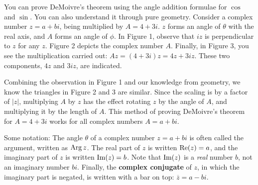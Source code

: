 \documentclass[../textbook.tex]{subfiles}
\begin{document}
You can prove DeMoivre’s theorem using the angle addition formulae for $\cos$ and $\sin$. You can also understand it through pure geometry. Consider a complex number $z = a + bi$, being multiplied by $A = 4 + 3i$. $z$ forms an angle of $\theta$ with the real axis, and $A$ forms an angle of $\phi$. In Figure 1, observe that $iz$ is perpendicular to $z$ for any $z$. Figure 2 depicts the complex number $A$. Finally, in Figure 3, you see the multiplication carried out: $Az = (4+3i)z = 4z + 3iz$. These two components, $4z$ and $3iz$, are indicated.

Combining the observation in Figure 1 and our knowledge from geometry, we know the triangles in Figure 2 and 3 are similar. Since the scaling is by a factor of $|z|$, multiplying $A$ by $z$ has the effect rotating $z$ by the angle of $A$, and multiplying it by the length of $A$. This method of proving DeMoivre's theorem for $A=4+3i$ works for all complex numbers $A=a+bi$.

Some notation: The angle $\theta$ of a complex number $z = a+bi$ is often called the argument, written as $\operatorname{Arg} z$. The real part of $z$ is written $\operatorname{Re} (z) = a$, and the imaginary part of $z$ is written $\operatorname{Im} (z) = b$. Note that $\operatorname{Im} (z)$ is a \textit{real} number $b$, not an imaginary number $bi$. Finally, the \textbf{complex conjugate} of $z$, in which the imaginary part is negated, is written with a bar on top: $\overline{z} = a-bi$.
\end{document}
